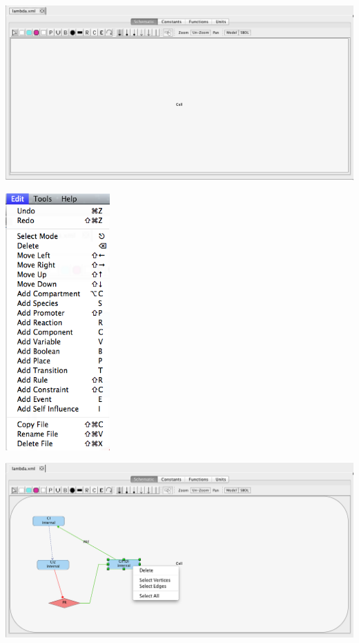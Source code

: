\documentclass[titlepage,11pt]{article}
\begin{document}
\begin{center}
\includegraphics[width=160mm]{screenshots/ModelEditor}
\end{center}

\begin{center}
\includegraphics[width=40mm]{screenshots/editMenu}
\end{center}

\begin{center}
\includegraphics[width=160mm]{screenshots/deleteSelect}
\end{center}
\end{document}
